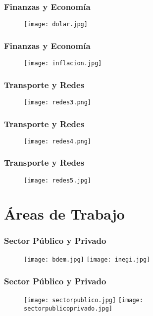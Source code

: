 \documentclass[xcolor=dvipsnames]{beamer}
\begin{document}
\begin{frame}\frametitle{Finanzas y Econom\'ia}
\begin{figure}[H]
\centering
\texttt{[image: dolar.jpg]}
\end{figure}
\end{frame}

\begin{frame}\frametitle{Finanzas y Econom\'ia}
\begin{figure}[H]
\centering
\texttt{[image: inflacion.jpg]}
\end{figure}
\end{frame}


\begin{frame}\frametitle{Transporte y Redes}
\begin{figure}[H]
\centering
\texttt{[image: redes3.png]}
\end{figure}
\end{frame}

\begin{frame}\frametitle{Transporte y Redes}
\begin{figure}[H]
\centering
\texttt{[image: redes4.png]}
\end{figure}
\end{frame}

\begin{frame}\frametitle{Transporte y Redes}
\begin{figure}[H]
\centering
\texttt{[image: redes5.jpg]}
\end{figure}
\end{frame}

\section{\'Areas de Trabajo}


\begin{frame}\frametitle{Sector P\'ublico y Privado}

\begin{figure}[H]
\centering
\texttt{[image: bdem.jpg]}\pause
\texttt{[image: inegi.jpg]}
\end{figure}
\end{frame}

\begin{frame}\frametitle{Sector P\'ublico y Privado}

\begin{figure}[H]
\centering
\texttt{[image: sectorpublico.jpg]}\pause
\texttt{[image: sectorpublicoprivado.jpg]}
\end{figure}
\end{frame}
\end{document}
